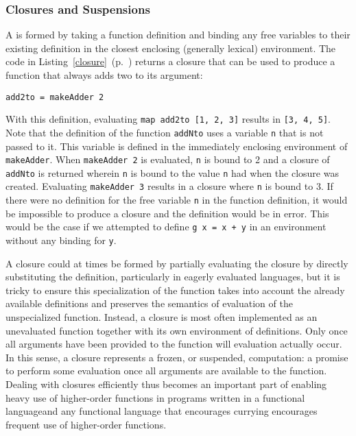 \subsubsection{Closures and Suspensions}
A  is formed by taking a function definition and binding any free variables to their existing definition in the closest enclosing (generally lexical) environment. The code in Listing~\ref{closure}~(p.~\pageref{closure}) returns a closure that can be used to produce a function that always adds two to its argument:
\begin{lstlisting}
add2to = makeAdder 2
\end{lstlisting}
With this definition, evaluating \lstinline{map add2to [1, 2, 3]} results in \lstinline{[3, 4, 5]}. Note that the definition of the function \lstinline{addNto} uses a variable \lstinline{n} that is not passed to it. This variable is defined in the immediately enclosing environment of \lstinline{makeAdder}. When \lstinline{makeAdder 2} is evaluated, \lstinline{n} is bound to 2 and a closure of \lstinline{addNto} is returned wherein \lstinline{n} is bound to the value \lstinline{n} had when the closure was created. Evaluating \lstinline{makeAdder 3} results in a closure where \lstinline{n} is bound to 3. If there were no definition for the free variable \lstinline{n} in the function definition, it would be impossible to produce a closure and the definition would be in error. This would be the case if we attempted to define \lstinline{g x = x + y} in an environment without any binding for \lstinline{y}.

A closure could at times be formed by partially evaluating the closure by directly substituting the definition, particularly in eagerly evaluated languages, but it is tricky to ensure this specialization of the function takes into account the already available definitions and preserves the semantics of evaluation of the unspecialized function. Instead, a closure is most often implemented as an unevaluated function together with its own environment of definitions. Only once all arguments have been provided to the function will evaluation actually occur. In this sense, a closure represents a frozen, or suspended, computation: a promise to perform some evaluation once all arguments are available to the function. Dealing with closures efficiently thus becomes an important part of enabling heavy use of higher-order functions in programs written in a functional language\empause and any functional language that encourages currying encourages frequent use of higher-order functions.

